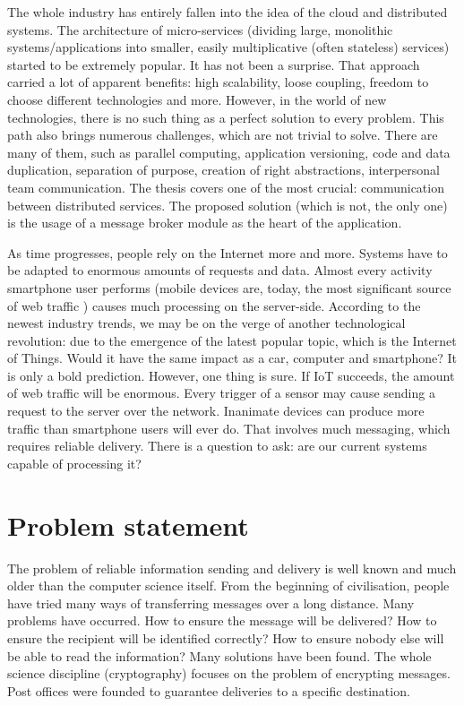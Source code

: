 The whole industry has entirely fallen into the idea of the cloud and distributed systems. The architecture of micro-services (dividing large, monolithic systems/applications into smaller, easily multiplicative (often stateless) services) started to be extremely popular. It has not been a surprise. That approach carried a lot of apparent benefits: high scalability, loose coupling,  freedom to choose different technologies and more. However, in the world of new technologies, there is no such thing as a perfect solution to every problem. This path also brings numerous challenges, which are not trivial to solve. There are many of them, such as parallel computing, application versioning, code and data duplication, separation of purpose, creation of right abstractions, interpersonal team communication. The thesis covers one of the most crucial: communication between distributed services. The proposed solution (which is not, the only one) is the usage of a message broker module as the heart of the application.

As time progresses, people rely on the Internet more and more. Systems have to be adapted to enormous amounts of requests and data. Almost every activity smartphone user performs (mobile devices are, today, the most significant source of web traffic \cite{traffic}) causes much processing on the server-side. According to the newest industry trends, we may be on the verge of another technological revolution: due to the emergence of the latest popular topic, which is the Internet of Things. Would it have the same impact as a car, computer and smartphone? It is only a bold prediction. However, one thing is sure. If IoT succeeds, the amount of web traffic will be enormous. Every trigger of a sensor may cause sending a request to the server over the network. Inanimate devices can produce more traffic than smartphone users will ever do. That involves much messaging, which requires reliable delivery. There is a question to ask: are our current systems capable of processing it?



\section{Problem statement}
\label{sec:problemStatement}

The problem of reliable information sending and delivery is well known and much older than the computer science itself. From the beginning of civilisation, people have tried many ways of transferring messages over a long distance. Many problems have occurred. How to ensure the message will be delivered? How to ensure the recipient will be identified correctly? How to ensure nobody else will be able to read the information? Many solutions have been found. The whole science discipline (cryptography) focuses on the problem of encrypting messages. Post offices were founded to guarantee deliveries to a specific destination.

